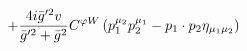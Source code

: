 %
\begin{dmath*}
%
  +  \frac{4 i {\bar g}^{\prime 2} v}{{\bar g}^{\prime 2} + {\bar g}{}^2}C^{ \varphi  W} \left(p_1^{\mu_2} p_2^{\mu_1} - p_{1}\nobreak\cdot\nobreak{}p_{2} \eta_{\mu_1 \mu_2}\right)
%
\end{dmath*}
%
